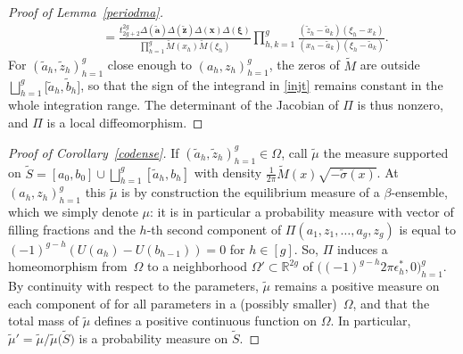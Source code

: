 \documentclass[10pt,a4paper]{amsart}
\numberwithin{equation}{section}
\begin{document}
\begin{proof}[Proof of Lemma~\ref{periodma}]
\begin{gather*}
\qquad{} = \frac{t_{2g + 2}^{2g} \Delta(\boldsymbol{\tilde{a}})\Delta(\boldsymbol{\tilde{z}}) \Delta(\boldsymbol{x}) \Delta(\boldsymbol{\xi})}{\prod_{h=1}^{g} \tilde{M}(x_{h}) \tilde{M}(\xi_{h})} \prod_{h,k = 1}^{g} \frac{(\tilde{z}_h - \tilde{a}_k)(\xi_h - x_k)}{(x_h - \tilde{a}_k)(\xi_h - \tilde{a}_k)}.
\end{gather*}
For $(\tilde{a}_h,\tilde{z}_h)_{h = 1}^{g}$ close enough to
$(a_h,z_h)_{h = 1}^{g}$, the zeros of $\tilde{M}$ are outside
$\bigsqcup_{h = 1}^{g} \bigl[\tilde{a}_{h},\tilde{b}_h\bigr]$, so that the
sign of the integrand in \eqref{injt} remains constant in the whole integration range. The determinant of the
Jacobian of $\Pi$ is thus nonzero, and $\Pi$ is a local
diffeomorphism.
\end{proof}

\begin{proof}[Proof of Corollary~\ref{codense}]
If $(\tilde{a}_h,\tilde{z}_h)_{h = 1}^{g} \in \Omega$, call $\tilde{\mu}$ the measure supported on $\tilde{S} = [a_0,b_0] \cup \bigsqcup_{h = 1}^{g} [\tilde{a}_h,b_h]$ with density $\frac{1}{2\pi} \tilde{M}(x)\sqrt{-\tilde{\sigma}(x)}$. At $(a_h,z_h)_{h = 1}^{g}$ this $\tilde{\mu}$ is by construction the equilibrium measure of a $\beta$-ensemble, which we simply denote $\mu$: it is in particular a probability measure with vector of filling fractions  and the $h$-th second component of $\Pi(a_1,z_1,\ldots,a_g,z_g)$ is equal to $(-1)^{g - h}(U(a_h) - U(b_{h - 1})) = 0$ for $h \in [g]$. So, $\Pi$ induces a homeomorphism from~$\Omega$ to a neighborhood $\Omega' \subset \mathbb{R}^{2g}$ of $\bigl((-1)^{g-h}2\pi \epsilon_h^* ,0\bigr)_{h = 1}^{g}$. By continuity with respect to the parameters, $\tilde{\mu}$ remains a positive measure on each component of  for all parameters in a (possibly smaller)~$\Omega$, and that the total mass of $\tilde{\mu}$ defines a positive continuous function on $\Omega$. In particular, $\tilde{\mu}' = \tilde{\mu}/\tilde{\mu}\big(\tilde{S}\big)$ is a probability measure on $\tilde{S}$.




\end{proof}
\end{document}

